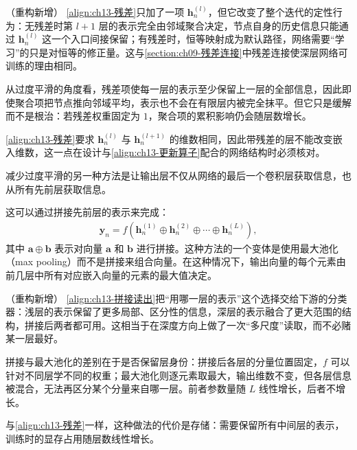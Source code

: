 \documentclass[../../main.tex]{subfiles}
\begin{document}
\begin{remark}（重构新增）
\eqref{align:ch13-残差}只加了一项 $\bm{h}_n^{(l)}$，但它改变了整个迭代的定性行为：无残差时第 $l+1$ 层的表示完全由邻域聚合决定，节点自身的历史信息只能通过 $\bm{h}_n^{(l)}$ 这一个入口间接保留；有残差时，恒等映射成为默认路径，网络需要“学习”的只是对恒等的修正量。这与\cref{section:ch09-残差连接}中残差连接使深层网络可训练的理由相同。\par
从过度平滑的角度看，残差项使每一层的表示至少保留上一层的全部信息，因此即使聚合项把节点推向邻域平均，表示也不会在有限层内被完全抹平。但它只是缓解而不是根治：若残差权重固定为 $1$，聚合项的累积影响仍会随层数增长。\par
\eqref{align:ch13-残差}要求 $\bm{h}_n^{(l)}$ 与 $\bm{h}_n^{(l+1)}$ 的维数相同，因此带残差的层不能改变嵌入维数，这一点在设计与\eqref{align:ch13-更新算子}配合的网络结构时必须核对。
\end{remark}

减少过度平滑的另一种方法是让输出层不仅从网络的最后一个卷积层获取信息，也从所有先前层获取信息。

\begin{definition}[跳跃连接读出]\label{definition:ch13-跳跃连接读出}
这可以通过拼接先前层的表示来完成：
\begin{align}
\bm{y}_n=f\!\left(\bm{h}_n^{(1)}\oplus\bm{h}_n^{(2)}\oplus\cdots\oplus\bm{h}_n^{(L)}\right),
\label{align:ch13-拼接读出}
\end{align}
其中 $\bm{a}\oplus\bm{b}$ 表示对向量 $\bm{a}$ 和 $\bm{b}$ 进行拼接。这种方法的一个变体是使用最大池化（max pooling）而不是拼接来组合向量。在这种情况下，输出向量的每个元素由前几层中所有对应嵌入向量的元素的最大值决定。
\end{definition}

\begin{remark}（重构新增）
\eqref{align:ch13-拼接读出}把“用哪一层的表示”这个选择交给下游的分类器：浅层的表示保留了更多局部、区分性的信息，深层的表示融合了更大范围的结构，拼接后两者都可用。这相当于在深度方向上做了一次“多尺度”读取，而不必赌某一层最好。\par
拼接与最大池化的差别在于是否保留层身份：拼接后各层的分量位置固定，$f$ 可以针对不同层学不同的权重；最大池化则逐元素取最大，输出维数不变，但各层信息被混合，无法再区分某个分量来自哪一层。前者参数量随 $L$ 线性增长，后者不增长。\par
与\eqref{align:ch13-残差}一样，这种做法的代价是存储：需要保留所有中间层的表示，训练时的显存占用随层数线性增长。
\end{remark}
\end{document}
